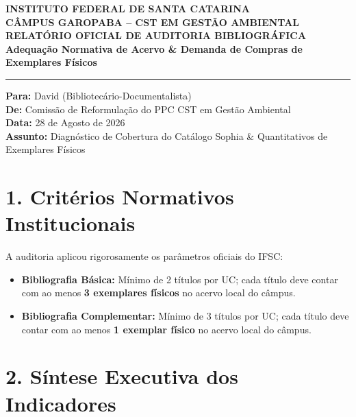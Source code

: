 \documentclass[11pt,a4paper]{article}
\begin{document}
\begin{center}
    {\large \textbf{INSTITUTO FEDERAL DE SANTA CATARINA}}\\[2pt]
    {\normalsize \textbf{CÂMPUS GAROPABA -- CST EM GESTÃO AMBIENTAL}}\\[6pt]
    {\LARGE \textbf{\textcolor{ifscgreen}{RELATÓRIO OFICIAL DE AUDITORIA BIBLIOGRÁFICA}}}\\[4pt]
    {\large \textbf{Adequação Normativa de Acervo \& Demanda de Compras de Exemplares Físicos}}\\[8pt]
    \rule{\linewidth}{1.5pt}
\end{center}

\vspace{0.3cm}
\noindent \textbf{Para:} David (Bibliotecário-Documentalista)\\
\textbf{De:} Comissão de Reformulação do PPC CST em Gestão Ambiental\\
\textbf{Data:} 28 de Agosto de 2026\\
\textbf{Assunto:} Diagnóstico de Cobertura do Catálogo Sophia \& Quantitativos de Exemplares Físicos

\vspace{0.4cm}
\section*{1. Critérios Normativos Institucionais}
A auditoria aplicou rigorosamente os parâmetros oficiais do IFSC:
\begin{itemize}
    \item \textbf{Bibliografia Básica:} Mínimo de 2 títulos por UC; cada título deve contar com ao menos \textbf{3 exemplares físicos} no acervo local do câmpus.
    \item \textbf{Bibliografia Complementar:} Mínimo de 3 títulos por UC; cada título deve contar com ao menos \textbf{1 exemplar físico} no acervo local do câmpus.
\end{itemize}

\section*{2. Síntese Executiva dos Indicadores}
\end{document}
